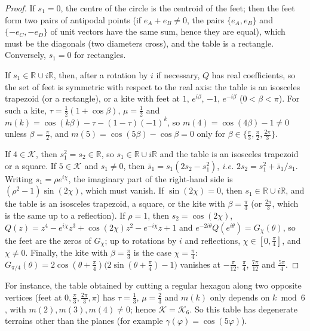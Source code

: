 \documentclass[a4paper,11pt,twoside,leqno]{article}
\newcommand{\ie}[0]{\emph{i.e.} }
\newcommand{\rr}[0]{\ensuremath{\mathbb{R}}}
\numberwithin{equation}{section}
\begin{document}
\begin{proof}
If $s_1 = 0$, the centre of the circle is the centroid of the feet; then the feet form two pairs of antipodal points (if $e_A + e_B \neq 0$, the pairs $\{e_A, e_B\}$ and $\{-e_C, -e_D\}$ of unit vectors have the same sum, hence they are equal), which must be the diagonals (two diameters cross), and the table is a rectangle. Conversely, $s_1 = 0$ for rectangles.

If $s_1 \in \rr \cup i\rr$, then, after a rotation by $i$ if necessary, $Q$ has real coefficients, so the set of feet is symmetric with respect to the real axis: the table is an isosceles trapezoid (or a rectangle), or a kite with feet at $1$, $e^{i\beta}$, $-1$, $e^{-i\beta}$ ($0 < \beta < \pi$). For such a kite, $\tau = \frac{1}{2}(1 + \cos \beta)$, $\mu = \frac{1}{2}$ and $m(k) = \cos(k\beta) - \tau - (1-\tau)(-1)^k$, so $m(4) = \cos(4\beta) - 1 \neq 0$ unless $\beta = \frac{\pi}{2}$, and $m(5) = \cos(5\beta) - \cos\beta = 0$ only for $\beta \in \{\frac{\pi}{3}, \frac{\pi}{2}, \frac{2\pi}{3}\}$.

If $4 \in \mathcal{K}$, then $s_1^2 = s_2 \in \rr$, so $s_1 \in \rr \cup i\rr$ and the table is an isosceles trapezoid or a square. If $5 \in \mathcal{K}$ and $s_1 \neq 0$, then $\bar s_1 = s_1(2s_2 - s_1^2)$, \ie $2s_2 = s_1^2 + \bar s_1/s_1$. Writing $s_1 = \rho e^{i\chi}$, the imaginary part of the right-hand side is $(\rho^2 - 1)\sin(2\chi)$, which must vanish. If $\sin(2\chi) = 0$, then $s_1 \in \rr \cup i\rr$, and the table is an isosceles trapezoid, a square, or the kite with $\beta = \frac{\pi}{3}$ (or $\frac{2\pi}{3}$, which is the same up to a reflection). If $\rho = 1$, then $s_2 = \cos(2\chi)$, $Q(z) = z^4 - e^{i\chi} z^3 + \cos(2\chi) z^2 - e^{-i\chi} z + 1$ and $e^{-2i\theta} Q(e^{i\theta}) = G_\chi(\theta)$, so the feet are the zeros of $G_\chi$; up to rotations by $i$ and reflections, $\chi \in [0, \frac{\pi}{4}]$, and $\chi \neq 0$. Finally, the kite with $\beta = \frac{\pi}{3}$ is the case $\chi = \frac{\pi}{4}$: $G_{\pi/4}(\theta) = 2\cos(\theta + \frac{\pi}{4})\big(2\sin(\theta + \frac{\pi}{4}) - 1\big)$ vanishes at $-\frac{\pi}{12}$, $\frac{\pi}{4}$, $\frac{7\pi}{12}$ and $\frac{5\pi}{4}$.
\end{proof}

For instance, the table obtained by cutting a regular hexagon along two opposite vertices (feet at $0, \frac{\pi}{3}, \frac{2\pi}{3}, \pi$) has $\tau = \frac{1}{3}$, $\mu = \frac{2}{3}$ and $m(k)$ only depends on $k \bmod 6$, with $m(2), m(3), m(4) \neq 0$; hence $\mathcal{K} = \mathcal{K}_6$. So this table has degenerate terrains other than the planes (for example $\gamma(\varphi) = \cos(5\varphi)$).
\end{document}
